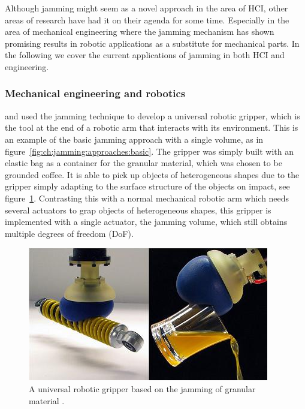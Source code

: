 Although jamming might seem as a novel approach in the area of HCI, other areas of research have had it on their agenda for some time. 
Especially in the area of mechanical engineering where the jamming mechanism has shown promising results in robotic applications as a substitute for mechanical parts.
In the following we cover the current applications of jamming in both HCI and engineering. 

\subsubsection{Mechanical engineering and robotics}

\citet{brown2010universal} and \citet{amend2012positive} used the jamming technique to develop a universal robotic gripper, which is the tool at the end of a robotic arm that interacts with its environment.
This is an example of the basic jamming approach with a single volume, as in figure~\ref{fig:ch:jamming:approaches:basic}.
The gripper was simply built with an elastic bag as a container for the granular material, which was chosen to be grounded coffee. 
It is able to pick up objects of heterogeneous shapes due to the gripper simply adapting to the surface structure of the objects on impact, see figure~\ref{fig:ch:jamming:jamming-robot-gripper}. 
Contrasting this with a normal mechanical robotic arm which needs several actuators to grap objects of heterogeneous shapes, this gripper is implemented with a single actuator, the jamming volume, which still obtains multiple degrees of freedom (DoF).

\begin{figure}[h]
  \centering
  \includegraphics[width=0.9\linewidth]{figures/jamming/jamming-robot-gripper}
	\caption[A universal robotic gripper based on the jamming of granular material by \citet{brown2010universal}.]
   {A universal robotic gripper based on the jamming of granular material \citep{brown2010universal}.}
   \label{fig:ch:jamming:jamming-robot-gripper}
\end{figure}

